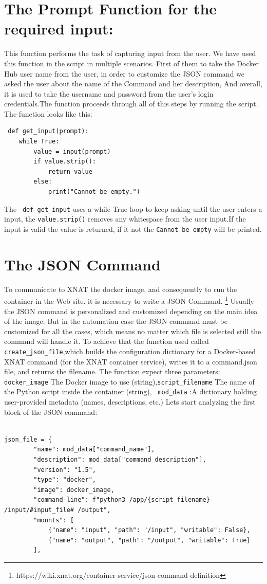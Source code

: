 \section{The Prompt Function for the required input:}

 This function performs the task of capturing input from the user.
 We have used this function in the script in multiple scenarios. First of them to take the Docker Hub user name from the user, in order to customize the JSON command we asked the user about the name of the Command and her description, And overall, it is used to take the username and password from the user's login credentials.The function proceeds through all of this steps by running the script.
 The function looks like this:
 
 \begin{lstlisting}
 def get_input(prompt):
    while True:
        value = input(prompt)
        if value.strip():
            return value
        else:
            print("Cannot be empty.")

\end{lstlisting}
The \texttt{ def get\_input} uses a while True loop to keep asking until the user enters a input, the \texttt{value.strip()} removes any whitespace from the user input.If the input is valid the value is returned, if it not the \texttt{Cannot be empty} will be printed.


\section{The JSON Command}

To communicate to XNAT the docker image, and consequently to run the container in the Web site. it is necessary to write a JSON Command. 
\footnote{https://wiki.xnat.org/container-service/json-command-definition}
Usually the JSON command is personalized and customized depending on the main idea of the image. But in the automation case the JSON command must be customized for all the cases, which means no matter which file is  selected still the command will handle it.
To achieve that the function used called \texttt{create\_json\_file},which builds the configuration dictionary for a Docker-based XNAT command (for the XNAT container service), writes it to a command.json file, and returns the filename.
The function expect three parameters:
\texttt{docker\_image} The Docker image to use (string),\texttt{script\_filename} The name of the Python script inside the container (string), \texttt{ mod\_data} :A dictionary holding user-provided metadata (names, descriptions, etc.)
Lets start analyzing the first block of the JSON command:
\begin{lstlisting}

json_file = {
        "name": mod_data["command_name"],
        "description": mod_data["command_description"],
        "version": "1.5",
        "type": "docker",
        "image": docker_image,
        "command-line": f"python3 /app/{script_filename} /input/#input_file# /output",
        "mounts": [
            {"name": "input", "path": "/input", "writable": False},
            {"name": "output", "path": "/output", "writable": True}
        ],
\end{lstlisting}


